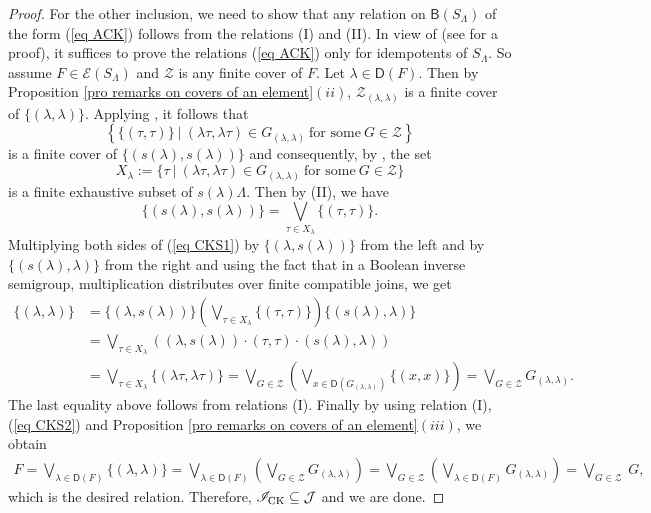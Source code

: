 \documentclass[a4paper,reqno,11pt]{amsart}
\numberwithin{equation}{section}
\theoremstyle{definition}
\theoremstyle{remark}
\begin{document}
\begin{proof}
For the other inclusion, we need to show that any relation on $\mathsf{B}(S_\Lambda)$ of the form (\ref{eq ACK}) follows from the relations (I) and (II). In view of \cite[Lemma 11.1]{LawsonCK} (see \cite[Lemma 3.1(1)]{LawNC} for a proof), it suffices to prove the relations (\ref{eq ACK}) only for idempotents of $S_\Lambda$. So assume $F\in \mathcal{E}(S_\Lambda)$ and $\mathcal{Z}$ is any finite cover of $F$. Let $\lambda\in \mathsf{D}(F)$. Then by Proposition \ref{pro remarks on covers of an element}$(ii)$, $\mathcal{Z}_{(\lambda,\lambda)}$ is a finite cover of $\{(\lambda,\lambda)\}$. Applying \cite[Lemma 4.6(2)]{Larki}, it follows that \[\left\{\{(\tau,\tau)\}~|~(\lambda\tau,\lambda\tau)\in G_{(\lambda,\lambda)}~\text{for some}~G\in \mathcal{Z}\right\}\] is a finite cover of $\{(s(\lambda),s(\lambda))\}$ and consequently, by \cite[Lemma 4.6(3)]{Larki}, the set \[X_\lambda:=\{\tau~|~(\lambda\tau,\lambda\tau)\in G_{(\lambda,\lambda)}~\text{for some}~G\in \mathcal{Z}\}\] is a finite exhaustive subset of $s(\lambda)\Lambda$. Then by (II), we have 
\begin{equation}\label{eq CKS1}
\{(s(\lambda),s(\lambda))\}=\displaystyle{\bigvee_{\tau\in X_\lambda}}\{(\tau,\tau)\}.   
\end{equation}
Multiplying both sides of (\ref{eq CKS1}) by $\{(\lambda,s(\lambda))\}$ from the left and by $\{(s(\lambda),\lambda)\}$ from the right and using the fact that in a Boolean inverse semigroup, multiplication distributes over finite compatible joins, we get 
\begin{align}\label{eq CKS2}
\{(\lambda,\lambda)\}&=\{(\lambda,s(\lambda))\}\left(\displaystyle{\bigvee_{\tau\in X_\lambda}}\{(\tau,\tau)\}\right)\{(s(\lambda),\lambda)\} \nonumber \\ 
&=\displaystyle{\bigvee_{\tau\in X_\lambda}}\left((\lambda,s(\lambda))\cdot (\tau,\tau)\cdot (s(\lambda),\lambda)\right) \nonumber\\
&=\displaystyle{\bigvee_{\tau\in X_\lambda}}\{(\lambda\tau,\lambda\tau)\}=\displaystyle{\bigvee_{G\in \mathcal{Z}}}\left(\displaystyle{\bigvee_{x\in \mathsf{D}(G_{(\lambda,\lambda)})}}\{(x,x)\}\right)=\displaystyle{\bigvee_{G\in \mathcal{Z}}}G_{(\lambda,\lambda)}.
\end{align}
The last equality above follows from relations (I). Finally by using relation (I), (\ref{eq CKS2}) and Proposition \ref{pro remarks on covers of an element}$(iii)$, we obtain 
\begin{align*}
F=\displaystyle{\bigvee_{\lambda\in \mathsf{D}(F)}}\{(\lambda,\lambda)\}=\displaystyle{\bigvee_{\lambda\in \mathsf{D}(F)}}\left(\displaystyle{\bigvee_{G\in \mathcal{Z}}} G_{(\lambda,\lambda)}\right)=\displaystyle{\bigvee_{G\in \mathcal{Z}}}\left(\displaystyle{\bigvee_{\lambda\in \mathsf{D}(F)}}G_{(\lambda,\lambda)}\right)=\displaystyle{\bigvee_{G\in \mathcal{Z}}}~G, 
\end{align*}
which is the desired relation. Therefore, $\mathscr{I}_{\textup{CK}}\subseteq \mathcal{J}$ and we are done. 
\end{proof}
\end{document}
